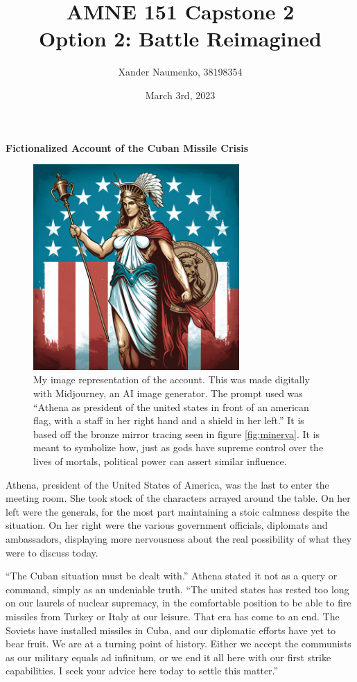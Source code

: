 \documentclass[letterpaper, reqno,11pt]{article}
\begin{document}
\title{AMNE 151 Capstone 2\\ \large Option 2: Battle Reimagined}
\date{March 3rd, 2023}
\author{Xander Naumenko, 38198354}
\maketitle

{\bf Fictionalized Account of the Cuban Missile Crisis}

\begin{figure}[htpb]
  \centering
  \includegraphics[width=0.7\textwidth]{im-athena}
  \caption{My image representation of the account. This was made digitally with Midjourney, an AI image generator. The prompt used was ``Athena as president of the united states in front of an american flag, with a staff in her right hand and a shield in her left.'' It is based off the bronze mirror tracing seen in figure \ref{fig:minerva}. It is meant to symbolize how, just as gods have supreme control over the lives of mortals, political power can assert similar influence.}
  \label{fig:im-athena}
\end{figure}


Athena, president of the United States of America, was the last to enter the meeting room. She took stock of the characters arrayed around the table. On her left were the generals, for the most part maintaining a stoic calmness despite the situation. On her right were the various government officials, diplomats and ambassadors, displaying more nervousness about the real possibility of what they were to discuss today. 

``The Cuban situation must be dealt with.'' Athena stated it not as a query or command, simply as an undeniable truth. ``The united states has rested too long on our laurels of nuclear supremacy, in the comfortable position to be able to fire missiles from Turkey or Italy at our leisure. That era has come to an end. The Soviets have installed missiles in Cuba, and our diplomatic efforts have yet to bear fruit. We are at a turning point of history. Either we accept the communists as our military equals ad infinitum, or we end it all here with our first strike capabilities. I seek your advice here today to settle this matter.''
\end{document}
